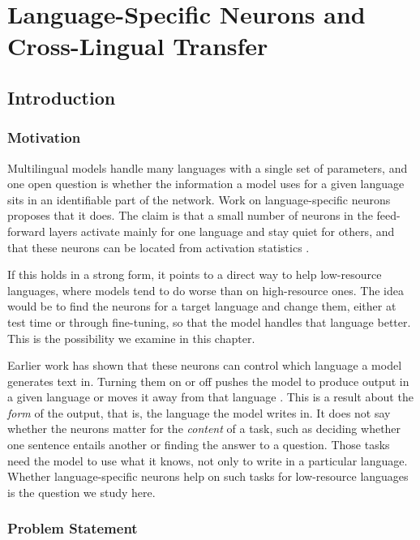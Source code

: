 \chapter{Language-Specific Neurons and Cross-Lingual Transfer}
\label{ch:neurons}

\section{Introduction}
\label{sec:neurons-intro}

\subsection{Motivation}
\label{subsec:neurons-motivation}

Multilingual models handle many languages with a single set of parameters, and one
open question is whether the information a model uses for a given language sits in
an identifiable part of the network. Work on language-specific neurons proposes
that it does. The claim is that a small number of neurons in the feed-forward
layers activate mainly for one language and stay quiet for others, and that these
neurons can be located from activation statistics
\citep{tang2024language, kojima2024multilingual}.

If this holds in a strong form, it points to a direct way to help low-resource
languages, where models tend to do worse than on high-resource ones. The idea would
be to find the neurons for a target language and change them, either at test time
or through fine-tuning, so that the model handles that language better. This is the
possibility we examine in this chapter.

Earlier work has shown that these neurons can control which language a model
generates text in. Turning them on or off pushes the model to produce output in a
given language or moves it away from that language
\citep{tang2024language, kojima2024multilingual}. This is a result about the
\emph{form} of the output, that is, the language the model writes in. It does not
say whether the neurons matter for the \emph{content} of a task, such as deciding
whether one sentence entails another or finding the answer to a question. Those
tasks need the model to use what it knows, not only to write in a particular
language. Whether language-specific neurons help on such tasks for low-resource
languages is the question we study here.

\subsection{Problem Statement}
\label{subsec:neurons-problem}

